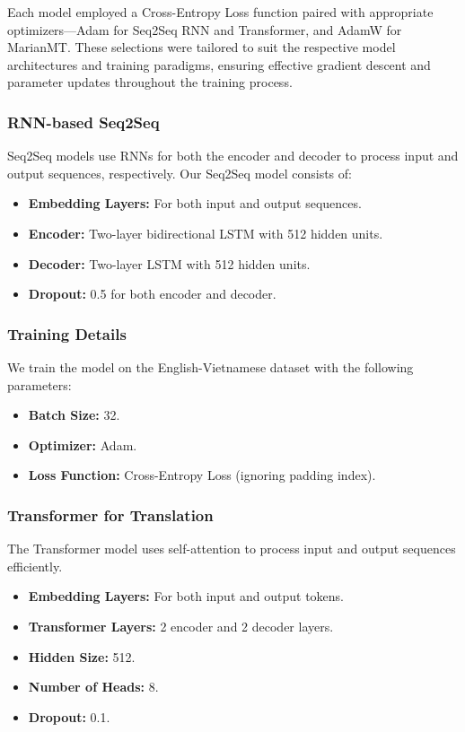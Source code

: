 \documentclass{article}
\begin{document}
Each model employed a Cross-Entropy Loss function paired with appropriate optimizers—Adam for Seq2Seq RNN and Transformer, and AdamW for MarianMT. These selections were tailored to suit the respective model architectures and training paradigms, ensuring effective gradient descent and parameter updates throughout the training process.

\subsubsection{RNN-based Seq2Seq}
Seq2Seq models use RNNs for both the encoder and decoder to process input and output sequences, respectively. Our Seq2Seq model consists of:

\begin{itemize}
\item \textbf{Embedding Layers:} For both input and output sequences.
\item \textbf{Encoder:} Two-layer bidirectional LSTM with 512 hidden units.
\item \textbf{Decoder:} Two-layer LSTM with 512 hidden units.
\item \textbf{Dropout:} 0.5 for both encoder and decoder.
\end{itemize}

\subsubsection{Training Details}
We train the model on the English-Vietnamese dataset with the following parameters:

\begin{itemize}
\item \textbf{Batch Size:} 32.
\item \textbf{Optimizer:} Adam.
\item \textbf{Loss Function:} Cross-Entropy Loss (ignoring padding index).
\end{itemize}

\subsubsection{Transformer for Translation}
The Transformer model uses self-attention to process input and output sequences efficiently.

\begin{itemize}
\item \textbf{Embedding Layers:} For both input and output tokens.
\item \textbf{Transformer Layers:} 2 encoder and 2 decoder layers.
\item \textbf{Hidden Size:} 512.
\item \textbf{Number of Heads:} 8.
\item \textbf{Dropout:} 0.1.
\end{itemize}
\end{document}
